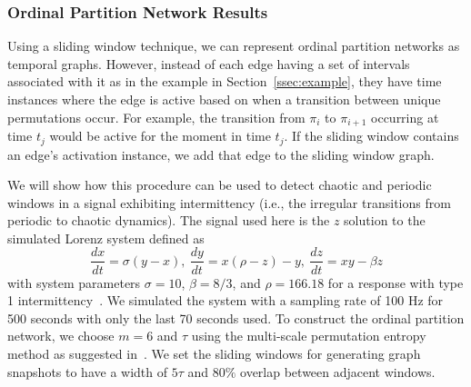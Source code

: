 \subsubsection{Ordinal Partition Network Results}
Using a sliding window technique, we can represent ordinal partition networks as temporal graphs. 
However, instead of each edge having a set of intervals associated with it as in the example in Section~\ref{ssec:example}, they have time instances where the edge is active  based on when a transition between unique permutations occur. 
For example, the transition from $\pi_i$ to $\pi_{i+1}$ occurring at time $t_j$ would be active for the moment in time $t_j$. 
If the sliding window contains an edge's activation instance, we add that edge to the sliding window graph.

We will show how this procedure can be used to detect chaotic and periodic windows in a signal exhibiting intermittency (i.e., the irregular transitions from periodic to chaotic dynamics). 
The signal used here is the $z$
%
solution to the simulated Lorenz system defined as
\begin{equation}
\frac{dx}{dt}   = \sigma (y-x), \: \frac{dy}{dt}   = x (\rho -z) - y, \: \frac{dz}{dt}   = xy - \beta z
 \label{eq:lorenz}
\end{equation}
with system parameters $\sigma = 10$, $\beta = 8/3$, and $\rho = 166.18$ for a response with type 1 intermittency~\cite{Pomeau1980}.
We simulated the system with a sampling rate of 100 Hz for 500 seconds with only the last 70 seconds used.
%
To construct the ordinal partition network, we choose $m=6$ and $\tau$ using the multi-scale permutation entropy method as suggested in~\cite{Myers2020c}. 
We set the sliding windows for generating graph snapshots to have a width of $5\tau$ and $80\%$ overlap between adjacent windows. 

